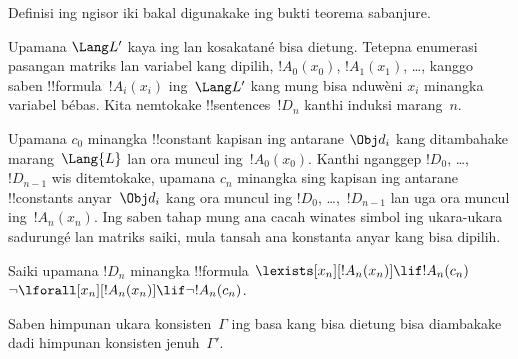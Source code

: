\documentclass[../../../include/open-logic-section]{subfiles}
\begin{document}
Definisi ing ngisor iki bakal digunakake ing bukti teorema sabanjure.

\begin{defn}
Upamana $\Lang L'$ kaya ing  lan kosakatané
bisa dietung. Tetepna enumerasi pasangan matriks lan variabel kang dipilih,
$!A_0(x_0)$, $!A_1(x_1)$, \dots, kanggo saben !!{formula}~$!A_i(x_i)$
ing~$\Lang L'$ kang mung bisa nduwèni $x_i$ minangka variabel bébas. Kita
nemtokake !!{sentence}s~$!D_n$ kanthi induksi marang~$n$.

Upamana $c_0$ minangka !!{constant} kapisan ing antarane $\Obj d_i$
kang ditambahake marang~$\Lang{L}$ lan ora muncul ing~$!A_0(x_0)$.
Kanthi nganggep $!D_0$, \dots,~$!D_{n-1}$ wis ditemtokake, upamana
$c_n$ minangka sing kapisan ing antarane !!{constant}s anyar~$\Obj
d_i$ kang ora muncul ing $!D_0$, \dots,~$!D_{n-1}$ lan uga ora muncul
ing~$!A_n(x_n)$. Ing saben tahap mung ana cacah winates simbol ing ukara-ukara sadurungé
lan matriks saiki, mula tansah ana konstanta anyar kang bisa dipilih.

Saiki upamana $!D_{n}$ minangka !!{formula} 
{$\lexists[x_{n}][!A_{n}(x_{n})] \lif
  !A_{n}(c_{n})$}{$\lnot\lforall[x_{n}][!A_{n}(x_{n})] \lif \lnot
  !A_{n}(c_{n})$}.
\end{defn}

\begin{lem}
Saben himpunan ukara konsisten~$\Gamma$ ing basa kang bisa dietung
bisa diambakake dadi himpunan
konsisten jenuh~$\Gamma'$.
\end{lem}
\end{document}
